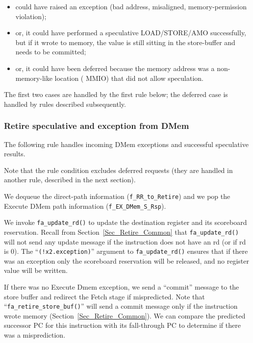 \begin{itemize}
 \item could have raised an exception (bad address,
       misaligned, memory-permission violation);
 \item or, it could have performed
       a speculative LOAD/STORE/AMO successfully, but if it wrote to memory,
       the value is still sitting in the store-buffer and needs to be
       committed;
 \item or, it could have been deferred because the memory address
       was a non-memory-like location ({\eg} MMIO) that did not allow
       speculation.
\end{itemize}

The first two cases are handled by the first rule below; the deferred
case is handled by rules described subsequently.


\subsubsection{Retire speculative and exception from DMem}

\label{Sec_Fife_Retire_DMem}

The following rule handles incoming DMem exceptions and successful
speculative results.


Note that the rule condition excludes deferred requests (they are
handled in another rule, described in the next section).

We dequeue the direct-path information (\verb|f_RR_to_Retire|) and we
pop the Execute DMem path information (\verb|f_EX_DMem_S_Rsp|).

We invoke \verb|fa_update_rd()| to update the destination register and
its scoreboard reservation.  Recall from
Section~\ref{Sec_Retire_Common} that \verb|fa_update_rd()| will not
send any update message if the instruction does not have an rd (or if
rd is 0).  The ``\verb|(!x2.exception)|'' argument to
\verb|fa_update_rd()| ensures that if there was an exception only the
scoreboard reservation will be released, and no register value will be
written.

If there was no Execute Dmem exception, we send a ``commit'' message
to the store buffer and redirect the Fetch stage if mispredicted.
Note that ``\verb|fa_retire_store_buf()|'' will send a commit message
only if the instruction wrote memory
(Section~\ref{Sec_Retire_Common}).  We can compare the predicted
successor PC for this instruction with its fall-through PC to
determine if there was a misprediction.

